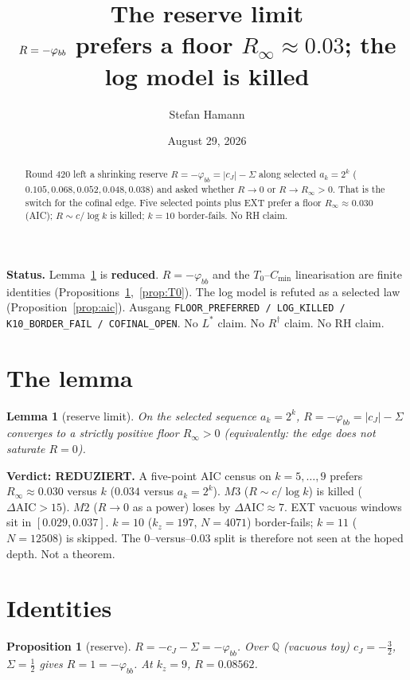 \documentclass[11pt]{article}
\title{\bfseries The reserve limit\\[2mm]
\large $R=-\phibb$ prefers a floor $R_\infty\approx 0.03$;
the log model is killed}
\author{Stefan Hamann}
\date{August 29, 2026}
\newtheorem{lemma}{Lemma}
\newtheorem{prop}{Proposition}
\theoremstyle{remark}
\newcommand{\phibb}{\varphi_{bb}}
\begin{document}
\maketitle

\begin{abstract}\noindent
Round 420 left a shrinking reserve
$R=-\phibb=|c_J|-\Sigma$ along selected $a_k=2^k$
($0.105,0.068,0.052,0.048,0.038$) and asked whether
$R\to 0$ or $R\to R_\infty>0$.
That is the switch for the cofinal edge.
Five selected points plus EXT prefer a floor
$R_\infty\approx 0.030$ (AIC); $R\sim c/\log k$ is
killed; $k=10$ border-fails.
No RH claim.
\end{abstract}

\medskip\noindent
\textbf{Status.}\enspace
Lemma~\ref{lem:lim} is \textbf{reduced}.
$R=-\phibb$ and the $T_0$--$C_{\min}$ linearisation
are finite identities
(Propositions~\ref{prop:R},~\ref{prop:T0}).
The log model is refuted as a selected law
(Proposition~\ref{prop:aic}).
Ausgang \texttt{FLOOR\_PREFERRED / LOG\_KILLED / K10\_BORDER\_FAIL / COFINAL\_OPEN}.
No $L^{*}$ claim.  No $R^{\dagger}$ claim.  No RH claim.

\section{The lemma}\label{sec:lem}

\begin{lemma}[reserve limit]\label{lem:lim}
On the selected sequence $a_k=2^k$,
$R=-\phibb=|c_J|-\Sigma$ converges to a strictly
positive floor $R_\infty>0$
(equivalently: the edge does not saturate $R=0$).
\end{lemma}

\noindent
\textbf{Verdict: REDUZIERT.}
A five-point AIC census on $k=5,\ldots,9$ prefers
$R_\infty\approx 0.030$ versus $k$
($0.034$ versus $a_k=2^k$).
$M3$ ($R\sim c/\log k$) is killed
($\Delta\mathrm{AIC}>15$).
$M2$ ($R\to 0$ as a power) loses by
$\Delta\mathrm{AIC}\approx 7$.
EXT vacuous windows sit in $[0.029,0.037]$.
$k=10$ ($k_z=197$, $N=4071$) border-fails;
$k=11$ ($N=12508$) is skipped.
The $0$--versus--$0.03$ split is therefore not
seen at the hoped depth.
Not a theorem.

\section{Identities}\label{sec:id}

\begin{prop}[reserve]\label{prop:R}
$R=-c_J-\Sigma=-\phibb$.
Over $\mathbb{Q}$ (vacuous toy) $c_J=-\tfrac32$,
$\Sigma=\tfrac12$ gives $R=1=-\phibb$.
At $k_z=9$, $R=0.08562$.
\end{prop}
\end{document}
